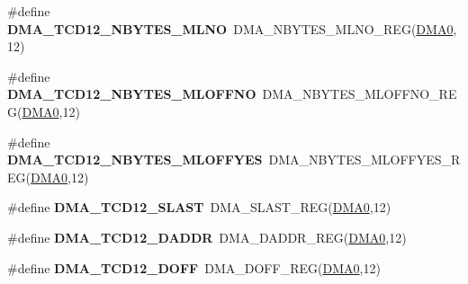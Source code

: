 \begin{DoxyCompactItemize}
\item 
\#define {\bfseries D\+M\+A\+\_\+\+T\+C\+D12\+\_\+\+N\+B\+Y\+T\+E\+S\+\_\+\+M\+L\+NO}~D\+M\+A\+\_\+\+N\+B\+Y\+T\+E\+S\+\_\+\+M\+L\+N\+O\+\_\+\+R\+EG(\hyperlink{group__DMA__Peripheral__Access__Layer_ga4103044f9ca209772f513dc694513ffb}{D\+M\+A0},12)\hypertarget{group__DMA__Register__Accessor__Macros_ga693b26ec7160da096f6632d935bbeb63}{}\label{group__DMA__Register__Accessor__Macros_ga693b26ec7160da096f6632d935bbeb63}

\item 
\#define {\bfseries D\+M\+A\+\_\+\+T\+C\+D12\+\_\+\+N\+B\+Y\+T\+E\+S\+\_\+\+M\+L\+O\+F\+F\+NO}~D\+M\+A\+\_\+\+N\+B\+Y\+T\+E\+S\+\_\+\+M\+L\+O\+F\+F\+N\+O\+\_\+\+R\+EG(\hyperlink{group__DMA__Peripheral__Access__Layer_ga4103044f9ca209772f513dc694513ffb}{D\+M\+A0},12)\hypertarget{group__DMA__Register__Accessor__Macros_gab1a3b0c41ce17352024cb6352bbca988}{}\label{group__DMA__Register__Accessor__Macros_gab1a3b0c41ce17352024cb6352bbca988}

\item 
\#define {\bfseries D\+M\+A\+\_\+\+T\+C\+D12\+\_\+\+N\+B\+Y\+T\+E\+S\+\_\+\+M\+L\+O\+F\+F\+Y\+ES}~D\+M\+A\+\_\+\+N\+B\+Y\+T\+E\+S\+\_\+\+M\+L\+O\+F\+F\+Y\+E\+S\+\_\+\+R\+EG(\hyperlink{group__DMA__Peripheral__Access__Layer_ga4103044f9ca209772f513dc694513ffb}{D\+M\+A0},12)\hypertarget{group__DMA__Register__Accessor__Macros_gae26b659783dba451d178c3834746ebab}{}\label{group__DMA__Register__Accessor__Macros_gae26b659783dba451d178c3834746ebab}

\item 
\#define {\bfseries D\+M\+A\+\_\+\+T\+C\+D12\+\_\+\+S\+L\+A\+ST}~D\+M\+A\+\_\+\+S\+L\+A\+S\+T\+\_\+\+R\+EG(\hyperlink{group__DMA__Peripheral__Access__Layer_ga4103044f9ca209772f513dc694513ffb}{D\+M\+A0},12)\hypertarget{group__DMA__Register__Accessor__Macros_ga37b08111761d48e8fcbd24b77c8bbec9}{}\label{group__DMA__Register__Accessor__Macros_ga37b08111761d48e8fcbd24b77c8bbec9}

\item 
\#define {\bfseries D\+M\+A\+\_\+\+T\+C\+D12\+\_\+\+D\+A\+D\+DR}~D\+M\+A\+\_\+\+D\+A\+D\+D\+R\+\_\+\+R\+EG(\hyperlink{group__DMA__Peripheral__Access__Layer_ga4103044f9ca209772f513dc694513ffb}{D\+M\+A0},12)\hypertarget{group__DMA__Register__Accessor__Macros_ga90f1085c61194e55a2a6367d7d03ff29}{}\label{group__DMA__Register__Accessor__Macros_ga90f1085c61194e55a2a6367d7d03ff29}

\item 
\#define {\bfseries D\+M\+A\+\_\+\+T\+C\+D12\+\_\+\+D\+O\+FF}~D\+M\+A\+\_\+\+D\+O\+F\+F\+\_\+\+R\+EG(\hyperlink{group__DMA__Peripheral__Access__Layer_ga4103044f9ca209772f513dc694513ffb}{D\+M\+A0},12)\hypertarget{group__DMA__Register__Accessor__Macros_gad80b977b0e363070cc25f99053dd7a77}{}\label{group__DMA__Register__Accessor__Macros_gad80b977b0e363070cc25f99053dd7a77}


\end{DoxyCompactItemize}
